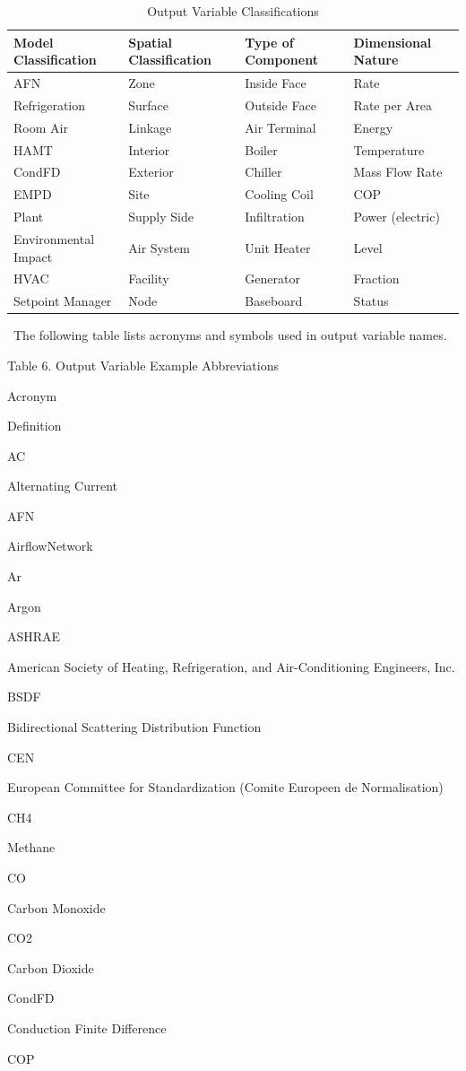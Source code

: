 \begin{longtable}[c]{p{1.5in}p{1.5in}p{1.5in}p{1.5in}}
\caption{Output Variable Classifications \protect \label{table:output-variable-classifications}}\\
\toprule 
Model Classification & Spatial Classification & Type of Component & Dimensional Nature \tabularnewline \midrule
\endhead
AFN & Zone & Inside Face & Rate \tabularnewline
Refrigeration & Surface & Outside Face & Rate per Area \tabularnewline
Room Air & Linkage & Air Terminal & Energy \tabularnewline
HAMT & Interior & Boiler & Temperature \tabularnewline
CondFD & Exterior & Chiller & Mass Flow Rate \tabularnewline
EMPD & Site & Cooling Coil & COP \tabularnewline
Plant & Supply Side & Infiltration & Power (electric) \tabularnewline
Environmental Impact & Air System & Unit Heater & Level \tabularnewline
HVAC & Facility & Generator & Fraction \tabularnewline
Setpoint Manager & Node & Baseboard & Status \tabularnewline
\bottomrule
\end{longtable}

~The following table lists acronyms and symbols used in output variable names.

Table 6. Output Variable Example Abbreviations

Acronym

Definition

AC

Alternating Current

AFN

AirflowNetwork

Ar

Argon

ASHRAE

American Society of Heating, Refrigeration, and Air-Conditioning Engineers, Inc.

BSDF

Bidirectional Scattering Distribution Function

CEN

European Committee for Standardization (Comite Europeen de Normalisation)

CH4

Methane

CO

Carbon Monoxide

CO2

Carbon Dioxide

CondFD

Conduction Finite Difference

COP

